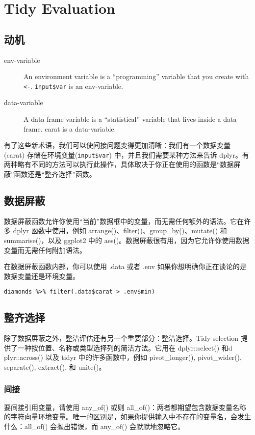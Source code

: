 \chapter{Tidy Evaluation\label{ch12}}
\section{动机}
\begin{description}
    \item[env-variable]
        An environment variable is a “programming” variable that you create with \verb|<-|. \verb|input$var| is an env-variable.
    \item[data-variable] A data frame variable is a “statistical” variable that lives inside a data frame. carat is a data-variable.
\end{description}
有了这些新术语，我们可以使间接问题变得更加清晰：我们有一个数据变量(carat) 存储在环境变量(\verb|input$var|) 中，并且我们需要某种方法来告诉 dplyr。有两种略有不同的方法可以执行此操作，具体取决于你正在使用的函数是“数据屏蔽”函数还是“整齐选择”函数。

\section{数据屏蔽}
数据屏蔽函数允许你使用“当前”数据框中的变量，而无需任何额外的语法。它在许多 dplyr 函数中使用，例如 arrange()、filter()、group\_by()、mutate() 和 summarise()，以及 ggplot2 中的 aes()。数据屏蔽很有用，因为它允许你使用数据变量而无需任何附加语法。

在数据屏蔽函数内部，你可以使用 .data 或者 .env 如果你想明确你正在谈论的是数据变量还是环境变量。

\verb|diamonds %>% filter(.data$carat > .env$min)|

\section{整齐选择}
除了数据屏蔽之外，整洁评估还有另一个重要部分：整洁选择。Tidy-selection 提供了一种按位置、名称或类型选择列的简洁方法。它用在 dplyr::select() 和d plyr::across() 以及 tidyr 中的许多函数中，例如 pivot\_longer(), pivot\_wider(), separate(), extract(), 和 unite()。
\subsection{间接}
要间接引用变量，请使用 any\_of() 或则 all\_of()：两者都期望包含数据变量名称的字符向量环境变量。唯一的区别是，如果你提供输入中不存在的变量名，会发生什么：all\_of() 会抛出错误，而 any\_of() 会默默地忽略它。

